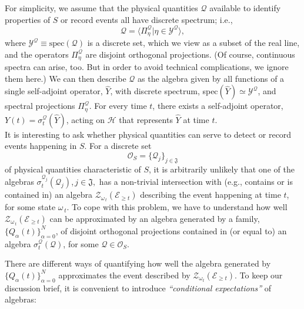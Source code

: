 \documentclass[12pt]{article}
\begin{document}
\begin{enumerate}
{For simplicity, we assume that the physical quantities $\mathcal{Q}$ available to identify properties of $S$ or record events all have discrete spectrum; i.e., 
\begin{equation}\label{phys-Q}
\mathcal{Q} = \langle \Pi_{\eta}^{\mathcal{Q}} \vert \eta \in \mathcal{Y}^{\mathcal{Q}} \rangle,
\end{equation}
where $\mathcal{Y}^{\mathcal{Q}} \equiv \text{spec}(\mathcal{Q})$ is a discrete set, which we view as a subset of the real line, and the operators $\Pi_{\eta}^{\mathcal{Q}}$ are disjoint orthogonal projections. (Of course, continuous spectra can arise, too. But in order to avoid technical complications, we ignore them here.)
We can then describe $\mathcal{Q}$ as the algebra given by all functions of a single self-adjoint operator, $\widehat{Y}$, with
discrete spectrum, spec$(\widehat{Y}) \simeq \mathcal{Y}^{\mathcal{Q}}$, and spectral projections $\Pi_{\eta}^{\mathcal{Q}}$. For every time $t$, there exists a self-adjoint operator,
$Y(t)=\sigma_{t}^{\mathcal{Q}}(\widehat{Y})$, acting on $\mathcal{H}$  that represents $\widehat{Y}$ at time $t$. \\
It is interesting to ask whether physical quantities can serve to detect or record events happening in $S$. For a discrete set
$$\mathcal{O}_{S}= \lbrace \mathcal{Q}_j \rbrace_{j \in \mathfrak{J}}$$
 of physical quantities characteristic of $S$, it is arbitrarily unlikely that one of the algebras $\sigma_{t}^{\mathcal{Q_{\textit{j}}}}(\mathcal{Q}_{j} )$,\,$j\in \mathfrak{J},$ has a non-trivial intersection with (e.g., contains or is contained in) an algebra 
 $\mathcal{Z}_{\omega_{\,t}}(\mathcal{E}_{\geq t})$ describing the event happening at time $t$, for some state $\omega_{\,t}$. To cope with this problem, we have to understand how well $\mathcal{Z}_{\omega_{\,t}}(\mathcal{E}_{\geq t})$ can be approximated by an algebra generated by a family, $\lbrace Q_{\alpha}(t) \rbrace_{\alpha=0}^{N}$, of disjoint orthogonal projections  contained in (or equal to) an algebra $\sigma_{t}^{\mathcal{Q}}(\mathcal{Q})$, for some $\mathcal{Q} \in \mathcal{O}_{S}$.
 
  There are different ways of quantifying how well the algebra generated by $\lbrace Q_{\alpha}(t) \rbrace_{\alpha=0}^{N}$ approximates the event described by $\mathcal{Z}_{\omega_t}(\mathcal{E}_{\geq t})$. To keep our discussion brief, it is 
 convenient to introduce \textit{``conditional expectations''} of algebras:\\
 
}
\end{enumerate}
\end{document}
